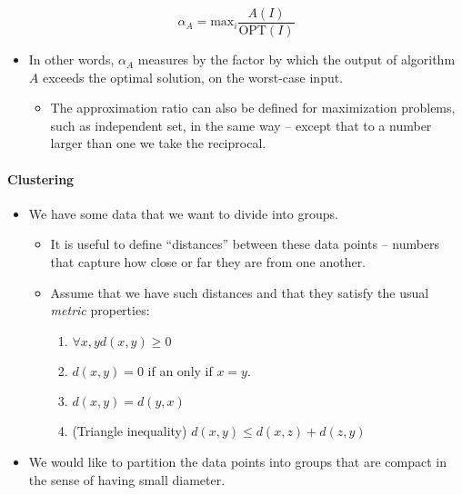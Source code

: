 \documentclass[a4paper,11pt]{article}
\begin{document}
\[\alpha_{A} = \text{max}_{i} \frac{A(I)}{\text{OPT}(I)}\]

\begin{itemize}
\itemsep1pt\parskip0pt
\item
  In other words, $\alpha_A$ measures by the factor by which the output
  of algorithm $A$ exceeds the optimal solution, on the worst-case
  input.

  \begin{itemize}
  \itemsep1pt\parskip0pt
  \item
    The approximation ratio can also be defined for maximization
    problems, such as independent set, in the same way -- except that to
    a number larger than one we take the reciprocal.
  \end{itemize}
\end{itemize}

\paragraph{Clustering}\label{clustering}

\begin{itemize}
\itemsep1pt\parskip0pt
\item
  We have some data that we want to divide into groups.

  \begin{itemize}
  \itemsep1pt\parskip0pt
  \item
    It is useful to define ``distances'' between these data points --
    numbers that capture how close or far they are from one another.
  \item
    Assume that we have such distances and that they satisfy the usual
    \emph{metric} properties:

    \begin{enumerate}
    \def\labelenumi{\arabic{enumi}.}
    \itemsep1pt\parskip0pt
    \item
      $\forall x, y d(x, y) \ge 0 $
    \item
      $d(x, y) = 0$ if an only if $x = y$.
    \item
      $d(x, y) = d(y, x)$
    \item
      (Triangle inequality) $d(x, y) \le d(x, z) + d(z, y)$
    \end{enumerate}
  \end{itemize}
\item
  We would like to partition the data points into groups that are
  compact in the sense of having small diameter.
\end{itemize}
\end{document}
